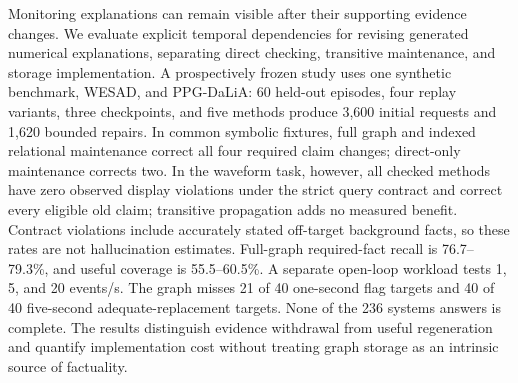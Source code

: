Monitoring explanations can remain visible after their supporting evidence changes. We evaluate explicit temporal dependencies for revising generated numerical explanations, separating direct checking, transitive maintenance, and storage implementation. A prospectively frozen study uses one synthetic benchmark, WESAD, and PPG-DaLiA: 60 held-out episodes, four replay variants, three checkpoints, and five methods produce 3,600 initial requests and 1,620 bounded repairs. In common symbolic fixtures, full graph and indexed relational maintenance correct all four required claim changes; direct-only maintenance corrects two. In the waveform task, however, all checked methods have zero observed display violations under the strict query contract and correct every eligible old claim; transitive propagation adds no measured benefit. Contract violations include accurately stated off-target background facts, so these rates are not hallucination estimates. Full-graph required-fact recall is 76.7--79.3\%, and useful coverage is 55.5--60.5\%. A separate open-loop workload tests 1, 5, and 20 events/s. The graph misses 21 of 40 one-second flag targets and 40 of 40 five-second adequate-replacement targets. None of the 236 systems answers is complete. The results distinguish evidence withdrawal from useful regeneration and quantify implementation cost without treating graph storage as an intrinsic source of factuality.
